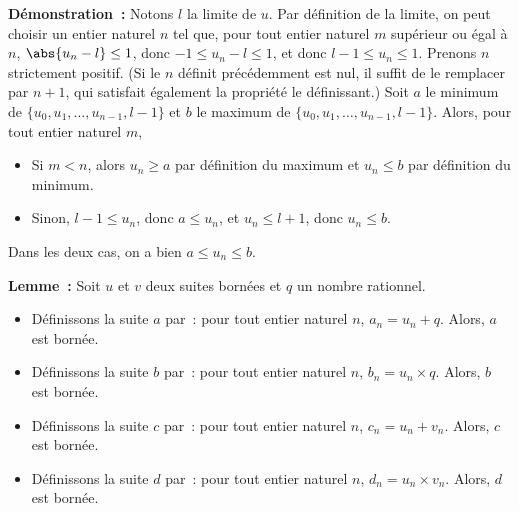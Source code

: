 \noindent\textbf{Démonstration :} Notons $l$ la limite de $u$.
    Par définition de la limite, on peut choisir un entier naturel $n$ tel que, pour tout entier naturel $m$ supérieur ou égal à $n$, $\abs{u_n-l} \leq 1$, donc $-1 \leq u_n-l \leq 1$, et donc $l-1 \leq u_n \leq 1$. 
    Prenons $n$ strictement positif.
    (Si le $n$ définit précédemment est nul, il suffit de le remplacer par $n+1$, qui satisfait également la propriété le définissant.)
    Soit $a$ le minimum de $\lbrace u_0, u_1, \dots, u_{n-1}, l-1 \rbrace$ et $b$ le maximum de $\lbrace u_0, u_1, \dots, u_{n-1}, l-1 \rbrace$.
    Alors, pour tout entier naturel $m$, 
    \begin{itemize}[nosep]
        \item Si $m < n$, alors $u_n \geq a$ par définition du maximum et $u_n \leq b$ par définition du minimum.
        \item Sinon, $l-1 \leq u_n$, donc $a \leq u_n$, et $u_n \leq l+1$, donc $u_n \leq b$.
    \end{itemize}
    Dans les deux cas, on a bien $a \leq u_n \leq b$.

    \done

\medskip

\noindent\textbf{Lemme :} Soit $u$ et $v$ deux suites bornées et $q$ un nombre rationnel.
    \begin{itemize}[nosep]
        \item Définissons la suite $a$ par : pour tout entier naturel $n$, $a_n = u_n + q$.
            Alors, $a$ est bornée.
        \item Définissons la suite $b$ par : pour tout entier naturel $n$, $b_n = u_n \times q$.
            Alors, $b$ est bornée.
        \item Définissons la suite $c$ par : pour tout entier naturel $n$, $c_n = u_n + v_n$.
            Alors, $c$ est bornée.
        \item Définissons la suite $d$ par : pour tout entier naturel $n$, $d_n = u_n \times v_n$.
            Alors, $d$ est bornée.
    \end{itemize}

\medskip

